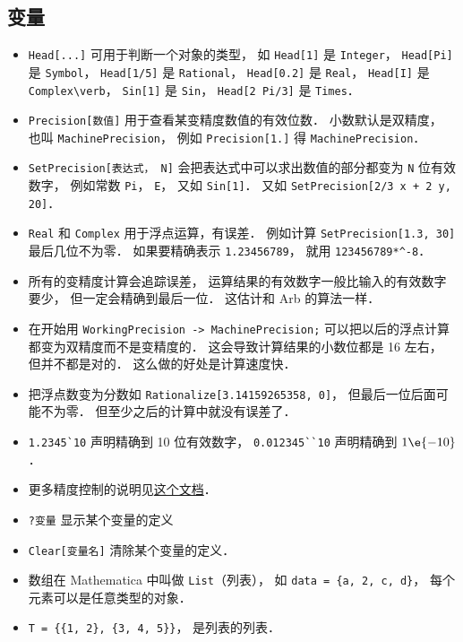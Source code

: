 \subsection{变量}
\begin{itemize}
\item \verb|Head[...]| 可用于判断一个对象的类型， 如 \verb|Head[1]| 是 \verb|Integer|， \verb|Head[Pi]| 是 \verb|Symbol|， \verb|Head[1/5]| 是 \verb|Rational|， \verb|Head[0.2]| 是 \verb|Real|， \verb|Head[I]| 是 \verb|Complex\verb|， \verb|Sin[1]|  是 \verb|Sin|， \verb|Head[2 Pi/3]| 是 \verb|Times|．
\item \verb|Precision[数值]| 用于查看某变精度数值的有效位数． 小数默认是双精度， 也叫 \verb|MachinePrecision|， 例如 \verb|Precision[1.]| 得 \verb|MachinePrecision|．
\item \verb|SetPrecision[表达式， N]| 会把表达式中可以求出数值的部分都变为 \verb|N| 位有效数字， 例如常数 \verb|Pi|， \verb|E|， 又如 \verb|Sin[1]|． 又如 \verb|SetPrecision[2/3 x + 2 y, 20]|．
\item \verb|Real| 和 \verb|Complex| 用于浮点运算，有误差． 例如计算 \verb|SetPrecision[1.3, 30]| 最后几位不为零． 如果要精确表示 \verb|1.23456789|， 就用 \verb|123456789*^-8|．
\item 所有的变精度计算会追踪误差， 运算结果的有效数字一般比输入的有效数字要少， 但一定会精确到最后一位． 这估计和 Arb 的算法一样．
\item 在开始用 \verb|WorkingPrecision -> MachinePrecision;| 可以把以后的浮点计算都变为双精度而不是变精度的． 这会导致计算结果的小数位都是 16 左右， 但并不都是对的． 这么做的好处是计算速度快．
\item 把浮点数变为分数如 \verb|Rationalize[3.14159265358, 0]|， 但最后一位后面可能不为零． 但至少之后的计算中就没有误差了．
\item \verb|1.2345`10| 声明精确到 10 位有效数字， \verb|0.012345``10| 声明精确到 $1\e{-10}$．
\item 更多精度控制的说明见\href{https://reference.wolfram.com/language/howto/ControlThePrecisionAndAccuracyOfNumericalResults.html}{这个文档}．
\item \verb|?变量| 显示某个变量的定义
\item \verb|Clear[变量名]| 清除某个变量的定义．
\item 数组在 Mathematica 中叫做 \verb|List|（列表）， 如 \verb|data = {a, 2, c, d}|， 每个元素可以是任意类型的对象．
\item \verb|T = {{1, 2}, {3, 4, 5}}|， 是列表的列表．
\end{itemize}

